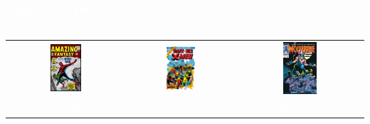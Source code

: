 \documentclass[12pt]{article}
\begin{document}
\vspace*{2cm}
\begin{center}
  {\Huge\bfseries\textcolor{white}{Choose Your Hero}}\\[1cm]
  {\large\textcolor{white}{Click a cover to jump to their reading order}}\\[1.5cm]

  \begin{minipage}{0.9\textwidth}
    \centering
    \begin{tabular}{ccc}
      \hyperlink{spiderman}{\includegraphics[width=0.28\textwidth]{Spiderman_Cover.jpg}} &
      \hyperlink{xmen}     {\includegraphics[width=0.28\textwidth]{Xmen_cover.jpg}}       &
      \hyperlink{wolverine}{\includegraphics[width=0.28\textwidth]{Wolverine_Cover.jpg}} \\
      \textcolor{white}{Spider-Man}            & \textcolor{white}{X-Men}                   & \textcolor{white}{Wolverine}      \\

\end{tabular}
\end{minipage}
\end{center}
\end{document}
